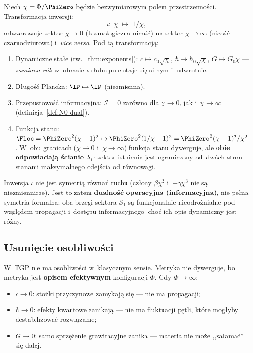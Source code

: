 \begin{theorem}\label{thm:N0-duality}
Niech $\chi = \Phi/\PhiZero$ b\k{e}dzie bezwymiarowym polem
przestrzenno\'sci. Transformacja inwersji:
\begin{equation}\label{eq:inversion}
    \iota\colon\; \chi \;\mapsto\; 1/\chi,
\end{equation}
odwzorowuje sektor $\chi \to 0$ (kosmologiczna nico\'s\'c)
na sektor $\chi \to \infty$ (nico\'s\'c czarnodziurowa)
i~\emph{vice versa}. Pod t\k{a} transformacj\k{a}:
\begin{enumerate}[nosep]
  \item Dynamiczne sta\l{}e (tw.~\ref{thm:exponents}):
    $c \mapsto c_0\sqrt{\chi}$,\; $\hbar \mapsto \hbar_0\sqrt{\chi}$,\;
    $G \mapsto G_0\chi$ --- \emph{zamiana r\'ol}: w~obrazie $\iota$
    s\l{}abe pole staje si\k{e} silnym i~odwrotnie.
  \item D\l{}ugo\'s\'c Plancka: $\lP \mapsto \lP$ (niezmienna). \checkmark
  \item Przepustowo\'s\'c informacyjna: $\mathcal{I} = 0$
    zar\'owno dla $\chi \to 0$, jak i~$\chi \to \infty$
    (definicja~\ref{def:N0-dual}). \checkmark
  \item Funkcja stanu: $\Floc = \PhiZero^2(\chi - 1)^2
    \mapsto \PhiZero^2(1/\chi - 1)^2 = \PhiZero^2(\chi-1)^2/\chi^2$.
    W~obu granicach ($\chi \to 0$ i~$\chi \to \infty$)
    funkcja stanu dywerguje, ale \textbf{obie odpowiadaj\k{a}
    \'scianie $\mathcal{S}_1$}: sektor istnienia jest ograniczony
    od~dw\'och stron stanami maksymalnego odej\'scia od
    r\'ownowagi.
\end{enumerate}
Inwersja $\iota$ nie jest symetri\k{a} r\'owna\'n ruchu
(cz\l{}ony $\beta\chi^2$ i~$-\gamma\chi^3$ nie s\k{a}
niezmiennicze). Jest to zatem \textbf{dualno\'s\'c
operacyjna (informacyjna)}, nie pe\l{}na symetria formalna:
oba brzegi sektora $\mathcal{S}_1$ s\k{a} funkcjonalnie
nieodr\'o\.znialne pod wzgl\k{e}dem propagacji i~dost\k{e}pu
informacyjnego, cho\'c ich opis dynamiczny jest r\'o\.zny.
\end{theorem}

\subsection{Usuni\k{e}cie osobliwo\'sci}\label{ssec:cd-sing}

W~TGP nie ma osobliwo\'sci w~klasycznym sensie. Metryka nie
dywerguje, bo metryka jest \textbf{opisem efektywnym}
konfiguracji $\Phi$. Gdy $\Phi \to \infty$:
\begin{itemize}[nosep]
  \item $c \to 0$: sto\.zki przyczynowe zamykaj\k{a} si\k{e} ---
        nie ma propagacji;
  \item $\hbar \to 0$: efekty kwantowe zanikaj\k{a} ---
        nie ma fluktuacji p\k{e}tli, kt\'ore mog\l{}yby
        destabilizowa\'c rozwi\k{a}zanie;
  \item $G \to 0$: samo sprz\k{e}\.zenie grawitacyjne zanika ---
        materia nie mo\.ze ,,za\l{}ama\'c'' si\k{e} dalej.
\end{itemize}

